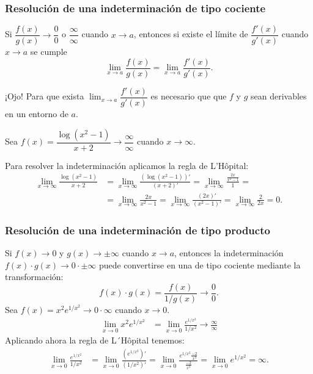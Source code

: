 	
	\begin{frame}
		\frametitle{Resolución de una indeterminación de tipo cociente}
		\begin{teorema}
			Si $\dfrac{f(x)}{g(x)}\rightarrow \dfrac{0}{0}$ o $\dfrac{\infty}{\infty}$ cuando $x\rightarrow a$, entonces si existe el límite de $\dfrac{f'(x)}{g'(x)}$ cuando $x\rightarrow a$ se cumple
			\[
				\lim_{x\rightarrow a}\frac{f(x)}{g(x)}=\lim_{x\rightarrow a}\frac{f'(x)}{g'(x)}.
			\]
		\end{teorema}
		
		\alert{¡Ojo!} Para que exista $\lim_{x\rightarrow a}\dfrac{f'(x)}{g'(x)}$ es necesario que que $f$ y $g$ sean derivables en un entorno de $a$.
		
		 Sea $f(x)=\dfrac{\log(x^2-1)}{x+2}\rightarrow \dfrac{\infty}{\infty}$ cuando $x\rightarrow \infty$.
		
		Para resolver la indeterminación aplicamos la regla de L'Hôpital:
		\begin{align*}
			\lim_{x\rightarrow \infty}\frac{\log(x^2-1)}{x+2} & = \lim_{x\rightarrow                                                                                                 
			\infty}\frac{\left(\log(x^2-1)\right)'}{\left(x+2\right)'}= \lim_{x\rightarrow \infty}\frac{\frac{2x}{x^2-1}}{1}=\\
			                                                  & =\lim_{x\rightarrow \infty}\frac{2x}{x^2-1}= \lim_{x\rightarrow \infty}\frac{\left(2x\right)'}{\left(x^2-1\right)'}= 
			\lim_{x\rightarrow \infty}\frac{2}{2x}=0.
		\end{align*}
	\end{frame}
	
	
	\begin{frame}
		\frametitle{Resolución de una indeterminación de tipo producto}
		Si $f(x)\rightarrow 0$ y $g(x)\rightarrow \pm\infty$ cuando $x\rightarrow a$, entonces la indeterminación $f(x)\cdot g(x)\rightarrow 0\cdot \pm\infty$ puede convertirse en una de tipo cociente mediante la transformación:
		\[
			f(x)\cdot g(x) = \frac{f(x)}{1/g(x)}\rightarrow \frac{0}{0}.
		\]
		 Sea $f(x)=x^2e^{1/x^2}\rightarrow 0\cdot\infty$ cuando $x\rightarrow 0$.
		\begin{align*}
			\lim_{x\rightarrow 0}x^2e^{1/x^2} & = \lim_{x\rightarrow 0}\frac{e^{1/x^2}}{1/x^2}\rightarrow \frac{\infty}{\infty} 
		\end{align*}
		Aplicando ahora la regla de L´Hôpital tenemos:
		\begin{align*}
			\lim_{x\rightarrow 0}\frac{e^{1/x^2}}{1/x^2} & = \lim_{x\rightarrow 
			0}\frac{\left(e^{1/x^2}\right)'}{\left(1/x^2\right)'} = \lim_{x\rightarrow
			0}\frac{e^{1/x^2}\frac{-2}{x^3}}{\frac{-2}{x^3}} = \lim_{x\rightarrow 0}e^{1/x^2}=\infty.
		\end{align*}
	\end{frame}
	
